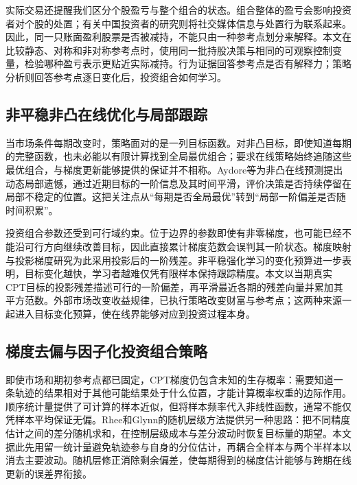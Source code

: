 实际交易还提醒我们区分个股盈亏与整个组合的状态。组合整体的盈亏会影响投资者对个股的处置\citep{an2024portfolio}；有关中国投资者的研究则将社交媒体信息与处置行为联系起来\citep{chen2025xueqiu}。因此，同一只账面盈利股票是否被减持，不能只由一种参考点划分来解释。本文在比较静态、对称和非对称参考点时，使用同一批持股决策与相同的可观察控制变量，检验哪种盈亏表示更贴近实际减持。行为证据回答参考点是否有解释力；策略分析则回答参考点逐日变化后，投资组合如何学习。

\subsection{非平稳非凸在线优化与局部跟踪}

当市场条件每期改变时，策略面对的是一列目标函数。对非凸目标，即使知道每期的完整函数，也未必能以有限计算找到全局最优组合；要求在线策略始终追随这些最优组合，与梯度更新能够提供的保证并不相称。Aydore等为非凸在线预测提出动态局部遗憾，通过近期目标的一阶信息及其时间平滑，评价决策是否持续停留在局部不稳定的位置\citep{aydore2019dynamic}。这把关注点从“每期是否全局最优”转到“局部一阶偏差是否随时间积累”。

投资组合参数还受到可行域约束。位于边界的参数即使有非零梯度，也可能已经不能沿可行方向继续改善目标，因此直接累计梯度范数会误判其一阶状态。梯度映射与投影梯度研究为此采用投影后的一阶残差\citep{hallak2025sound,lan2026projected}。非平稳强化学习的变化预算进一步表明，目标变化越快，学习者越难仅凭有限样本保持跟踪精度\citep{feng2023nonstationary}。本文以当期真实CPT目标的投影残差描述可行的一阶偏差，再平滑最近各期的残差向量并累加其平方范数。外部市场改变收益规律，已执行策略改变财富与参考点；这两种来源一起进入目标变化预算，使在线界能够对应到投资过程本身。

\subsection{梯度去偏与因子化投资组合策略}

即使市场和期初参考点都已固定，CPT梯度仍包含未知的生存概率：需要知道一条轨迹的结果相对于其他可能结果处于什么位置，才能计算概率权重的边际作用。顺序统计量提供了可计算的样本近似\citep{lepel2026policygradients}，但将样本频率代入非线性函数，通常不能仅凭样本平均保证无偏。Rhee和Glynn的随机层级方法提供另一种思路：把不同精度估计之间的差分随机求和，在控制层级成本与差分波动时恢复目标量的期望\citep{rhee2015unbiased}。本文据此先用留一统计量避免轨迹参与自身的分位估计，再耦合全样本与两个半样本以消去主要波动。随机层修正消除剩余偏差，使每期得到的梯度估计能够与跨期在线更新的误差界衔接。

